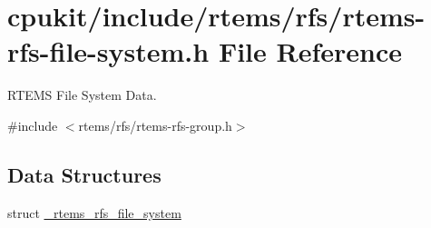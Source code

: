 \hypertarget{rtems-rfs-file-system_8h}{}\section{cpukit/include/rtems/rfs/rtems-\/rfs-\/file-\/system.h File Reference}
\label{rtems-rfs-file-system_8h}


R\+T\+E\+MS File System Data.  


{\ttfamily \#include $<$rtems/rfs/rtems-\/rfs-\/group.\+h$>$}\newline
\subsection*{Data Structures}
\begin{DoxyCompactItemize}
\item 
struct \mbox{\hyperlink{struct__rtems__rfs__file__system}{\+\_\+rtems\+\_\+rfs\+\_\+file\+\_\+system}}
\end{DoxyCompactItemize}
